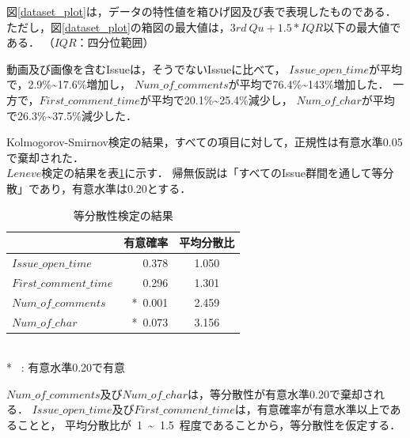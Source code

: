 図\ref{dataset_plot}は，データの特性値を箱ひげ図及び表で表現したものである．
ただし，図\ref{dataset_plot}の箱図の最大値は，$3rd~Qu + 1.5 * IQR$以下の最大値である．
（$IQR$：四分位範囲）%

動画及び画像を含むIssueは，そうでないIssueに比べて，
$Issue\_open\_time$が平均で，2.9\%\textasciitilde17.6\%増加し，
$Num\_of\_comments$が平均で76.4\%\textasciitilde143\%増加した．
一方で，$First\_comment\_time$が平均で20.1\%\textasciitilde25.4\%減少し，
$Num\_of\_char$が平均で26.3\%\textasciitilde 37.5\%減少した．

Kolmogorov-Smirnov検定の結果，すべての項目に対して，正規性は有意水準0.05で棄却された．
\\
$Leneve$検定の結果を表\ref{levene_result}に示す．
帰無仮説は「すべてのIssue群間を通して等分散」であり，有意水準は0.20とする．

\begin{table}[h]
  \begin{center}
  \caption{等分散性検定の結果}
  \begin{tabular}{l|r c} 
    \hline
     & 有意確率 & 平均分散比 \\ 
    \hline \hline
    $Issue\_open\_time$ & 0.378 & 1.050 \\
    $First\_comment\_time$ & 0.296 & 1.301 \\
    $Num\_of\_comments$ & *~0.001 & 2.459 \\
    $Num\_of\_char$ & *~0.073 & 3.156 \\
    \hline
  \end{tabular}\\
  \small
    *~ : 有意水準0.20で有意\\
  \label{levene_result}
  \end{center}
\end{table}

$Num\_of\_comments$及び$Num\_of\_char$は，等分散性が有意水準0.20で棄却される．
$Issue\_open\_time$及び$First\_comment\_time$は，有意確率が有意水準以上であることと，
平均分散比が~1~\textasciitilde ~1.5~程度であることから，等分散性を仮定する．


